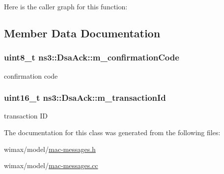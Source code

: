 Here is the caller graph for this function\+:




\subsection{Member Data Documentation}
\subsubsection[{\texorpdfstring{m\+\_\+confirmation\+Code}{m_confirmationCode}}]{\setlength{\rightskip}{0pt plus 5cm}uint8\+\_\+t ns3\+::\+Dsa\+Ack\+::m\+\_\+confirmation\+Code\hspace{0.3cm}{\ttfamily [private]}}\hypertarget{classns3_1_1DsaAck_af3f7f72451aefbe3bc723d5fad029e31}{}\label{classns3_1_1DsaAck_af3f7f72451aefbe3bc723d5fad029e31}


confirmation code 

\subsubsection[{\texorpdfstring{m\+\_\+transaction\+Id}{m_transactionId}}]{\setlength{\rightskip}{0pt plus 5cm}uint16\+\_\+t ns3\+::\+Dsa\+Ack\+::m\+\_\+transaction\+Id\hspace{0.3cm}{\ttfamily [private]}}\hypertarget{classns3_1_1DsaAck_a676b6f532f6aadd690d91090d2df7273}{}\label{classns3_1_1DsaAck_a676b6f532f6aadd690d91090d2df7273}


transaction ID 



The documentation for this class was generated from the following files\+:\begin{DoxyCompactItemize}
\item 
wimax/model/\hyperlink{mac-messages_8h}{mac-\/messages.\+h}\item 
wimax/model/\hyperlink{mac-messages_8cc}{mac-\/messages.\+cc}\end{DoxyCompactItemize}

